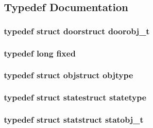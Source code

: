 \subsection{Typedef Documentation}
\hypertarget{WL__DEF_8H_abd6b6b9cbd9aa997cf2d36c0d720fab4}{
\subsubsection[{doorobj\_\-t}]{\setlength{\rightskip}{0pt plus 5cm}typedef struct {\bf doorstruct}  {\bf doorobj\_\-t}}}
\label{WL__DEF_8H_abd6b6b9cbd9aa997cf2d36c0d720fab4}
\hypertarget{WL__DEF_8H_aaf54715c9b83afe8794059fcf5fd5e7e}{
\subsubsection[{fixed}]{\setlength{\rightskip}{0pt plus 5cm}typedef long {\bf fixed}}}
\label{WL__DEF_8H_aaf54715c9b83afe8794059fcf5fd5e7e}
\hypertarget{WL__DEF_8H_a20769275a91bc44f3af3a4631fda125b}{
\subsubsection[{objtype}]{\setlength{\rightskip}{0pt plus 5cm}typedef struct {\bf objstruct}  {\bf objtype}}}
\label{WL__DEF_8H_a20769275a91bc44f3af3a4631fda125b}
\hypertarget{WL__DEF_8H_a312a767eadd479a332731db226723b8c}{
\subsubsection[{statetype}]{\setlength{\rightskip}{0pt plus 5cm}typedef struct {\bf statestruct}  {\bf statetype}}}
\label{WL__DEF_8H_a312a767eadd479a332731db226723b8c}
\hypertarget{WL__DEF_8H_a787f557008f1a15b3c7ffb8d611afc13}{
\subsubsection[{statobj\_\-t}]{\setlength{\rightskip}{0pt plus 5cm}typedef struct {\bf statstruct}  {\bf statobj\_\-t}}}
\label{WL__DEF_8H_a787f557008f1a15b3c7ffb8d611afc13}



